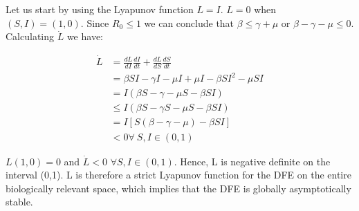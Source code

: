 Let us start by using the Lyapunov function $L = I$.
$L = 0$ when $(S,I) = (1,0)$. Since $R_0 \leq 1$ we can conclude that $\beta \leq \gamma + \mu$ or $\beta - \gamma - \mu \leq 0$. Calculating $\dot{L}$ we have:

\begin{align*}
    \dot{L} &= \frac{dL}{dI} \frac{dI}{dt} + \frac{dL}{dS} \frac{dS}{dt} \\
          &= \beta SI - \gamma I - \mu I + \mu I - \beta S I^2 - \mu SI \\
          &= I (\beta S - \gamma - \mu S - \beta SI) \\
          &\leq I (\beta S - \gamma S - \mu S - \beta SI) \\
          &= I [S (\beta - \gamma - \mu) - \beta SI]\\
          &< 0 \forall\ S,I \in (0,1)
\end{align*}

$L(1,0) = 0$ and $\dot{L} < 0$ $\forall S,I \in (0,1)$. Hence, L is negative definite on the interval (0,1). L is therefore a strict Lyapunov function for the DFE on the entire biologically relevant space, which implies that the DFE is globally asymptotically stable.
